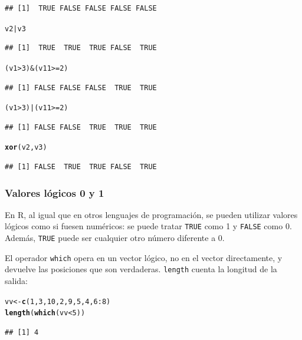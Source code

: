 \documentclass{config/apuntes}\usepackage[]{graphicx}\usepackage[]{xcolor}
\makeatletter
\newcommand{\hlnum}[1]{\textcolor[rgb]{0.686,0.059,0.569}{#1}}%
\newcommand{\hlopt}[1]{\textcolor[rgb]{0,0,0}{#1}}%
\newcommand{\hldef}[1]{\textcolor[rgb]{0.345,0.345,0.345}{#1}}%
\newcommand{\hlkwb}[1]{\textcolor[rgb]{0.69,0.353,0.396}{#1}}%
\newcommand{\hlkwd}[1]{\textcolor[rgb]{0.737,0.353,0.396}{\textbf{#1}}}%
\newenvironment{kframe}{%
 \def\at@end@of@kframe{}%
 \ifinner\ifhmode%
  \def\at@end@of@kframe{\end{minipage}}%
  \begin{minipage}{\columnwidth}%
 \fi\fi%
 \def\FrameCommand##1{\hskip\@totalleftmargin \hskip-\fboxsep
 \colorbox{shadecolor}{##1}\hskip-\fboxsep
     \hskip-\linewidth \hskip-\@totalleftmargin \hskip\columnwidth}%
 \MakeFramed {\advance\hsize-\width
   \@totalleftmargin\z@ \linewidth\hsize
   \@setminipage}}%
 {\par\unskip\endMakeFramed%
 \at@end@of@kframe}
\newenvironment{knitrout}{}{} %
\newcommand{\code}[1]{\texttt{#1}}
\makeatother
\begin{document}
\begin{knitrout}
\begin{kframe}
\begin{alltt}
\end{alltt}
\begin{verbatim}
## [1]  TRUE FALSE FALSE FALSE FALSE
\end{verbatim}
\begin{alltt}
\hldef{v2} \hlopt{|} \hldef{v3}
\end{alltt}
\begin{verbatim}
## [1]  TRUE  TRUE  TRUE FALSE  TRUE
\end{verbatim}
\begin{alltt}
\hldef{(v1} \hlopt{>} \hlnum{3}\hldef{)} \hlopt{&} \hldef{(v11} \hlopt{>=} \hlnum{2}\hldef{)}
\end{alltt}
\begin{verbatim}
## [1] FALSE FALSE FALSE  TRUE  TRUE
\end{verbatim}
\begin{alltt}
\hldef{(v1} \hlopt{>} \hlnum{3}\hldef{)} \hlopt{|} \hldef{(v11} \hlopt{>=} \hlnum{2}\hldef{)}
\end{alltt}
\begin{verbatim}
## [1] FALSE FALSE  TRUE  TRUE  TRUE
\end{verbatim}
\begin{alltt}
\hlkwd{xor}\hldef{(v2, v3)}
\end{alltt}
\begin{verbatim}
## [1] FALSE  TRUE  TRUE FALSE  TRUE
\end{verbatim}
\end{kframe}
\end{knitrout}

\subsubsection{Valores lógicos 0 y 1}
En R, al igual que en otros lenguajes de programación, se pueden utilizar valores lógicos como si fuesen numéricos: se puede tratar \code{TRUE} como 1 y \code{FALSE} como 0. Además, \code{TRUE} puede ser cualquier otro número diferente a 0. 

El operador \code{which} opera en un vector lógico, no en el vector directamente, y devuelve las posiciones que son verdaderas. \code{length} cuenta la longitud de la salida:

\begin{knitrout}
\color{fgcolor}\begin{kframe}
\begin{alltt}
\hldef{vv} \hlkwb{<-} \hlkwd{c}\hldef{(}\hlnum{1}\hldef{,} \hlnum{3}\hldef{,} \hlnum{10}\hldef{,} \hlnum{2}\hldef{,} \hlnum{9}\hldef{,} \hlnum{5}\hldef{,} \hlnum{4}\hldef{,} \hlnum{6}\hlopt{:}\hlnum{8}\hldef{)}
\hlkwd{length}\hldef{(}\hlkwd{which}\hldef{(vv} \hlopt{<} \hlnum{5}\hldef{))}
\end{alltt}
\begin{verbatim}
## [1] 4
\end{verbatim}
\end{kframe}
\end{knitrout}
\end{document}
